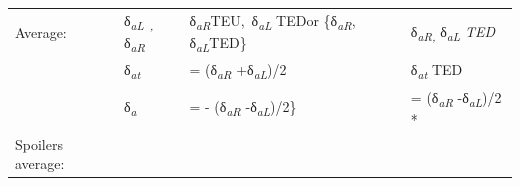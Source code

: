 \documentclass[
]{book}
\begin{document}
\begin{longtable}[]{@{}llll@{}}
\begin{minipage}[t]{0.35\columnwidth}
Average:\strut
\end{minipage} & \begin{minipage}[t]{0.13\columnwidth}\raggedright
δ\emph{\textsubscript{aL~,}} δ\emph{\textsubscript{aR}}\strut
\end{minipage} & \begin{minipage}[t]{0.26\columnwidth}\raggedright
δ\emph{\textsubscript{aR}}TEU,~δ\textsubscript{\emph{aL}} TEDor \{δ\emph{\textsubscript{aR}}, δ\emph{\textsubscript{aL}}TED\}\strut
\end{minipage} & \begin{minipage}[t]{0.14\columnwidth}\raggedright
δ\emph{\textsubscript{aR,}} δ\emph{\textsubscript{aL} TED}\strut
\end{minipage}\tabularnewline
\begin{minipage}[t]{0.35\columnwidth}\raggedright
\strut
\end{minipage} & \begin{minipage}[t]{0.13\columnwidth}\raggedright
δ\emph{\textsubscript{at}}\strut
\end{minipage} & \begin{minipage}[t]{0.26\columnwidth}\raggedright
= (δ\emph{\textsubscript{aR}} +δ\emph{\textsubscript{aL}})/2\strut
\end{minipage} & \begin{minipage}[t]{0.14\columnwidth}\raggedright
δ\emph{\textsubscript{at}} TED\strut
\end{minipage}\tabularnewline
\begin{minipage}[t]{0.35\columnwidth}\raggedright
\strut
\end{minipage} & \begin{minipage}[t]{0.13\columnwidth}\raggedright
δ\emph{\textsubscript{a}}\strut
\end{minipage} & \begin{minipage}[t]{0.26\columnwidth}\raggedright
= - (δ\emph{\textsubscript{aR}} -δ\emph{\textsubscript{aL}})/2\}\strut
\end{minipage} & \begin{minipage}[t]{0.14\columnwidth}\raggedright
= (δ\emph{\textsubscript{aR}} -δ\emph{\textsubscript{aL}})/2 *\strut
\end{minipage}\tabularnewline
\begin{minipage}[t]{0.35\columnwidth}\raggedright
Spoilers average:


\end{minipage}
\end{longtable}
\end{document}
